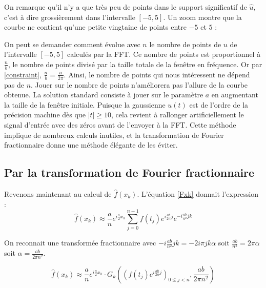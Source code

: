 \documentclass{article}
\begin{document}
On remarque qu'il n'y a que très peu de points dans le support significatif de $\hat{u}$, c'est à dire grossièrement dans l'intervalle $[-5, 5]$. Un zoom montre que la courbe ne contient qu'une petite vingtaine de points entre $-5$ et $5$ :

\begin{center}
\end{center}

On peut se demander comment évolue avec $n$ le nombre de points de $u$ de l'intervalle $[-5, 5]$ calculés par la FFT. 
Ce nombre de points est proportionnel à $\frac{n}{b}$, le nombre de points divisé par la taille totale de la fenêtre en fréquence. Or par \eqref{constraint}, $\frac{n}{b} = \frac{a}{2\pi}$. 
Ainsi, le nombre de points qui nous intéressent ne dépend pas de $n$. Jouer sur le nombre de points n'améliorera pas l'allure de la courbe obtenue.
La solution standard consiste à jouer sur le paramètre $a$ en augmentant la taille de la fenêtre initiale. 
Puisque la gaussienne $u(t)$ est de l'ordre de la précision machine dès que $|t| \ge 10$, cela revient à rallonger artificiellement le signal d'entrée avec des zéros avant de l'envoyer à la FFT. 
Cette méthode implique de nombreux calculs inutiles, et la transformation de Fourier fractionnaire donne une méthode élégante de les éviter.


\subsection{Par la transformation de Fourier fractionnaire}

Revenons maintenant au calcul de $\hat{f}(x_k)$. L'équation \eqref{Fxk} donnait l'expression : 
$$\hat{f}(x_k) \approx \frac{a}{n} e^{i\frac{a}{2}x_k}\sum_{j=0}^{n-1}f(t_j)e^{i\frac{ab}{2n}j}e^{-i\frac{ab}{n^2}jk}$$


On reconnait une transformée fractionnaire avec $-i\frac{ab}{n^2}jk=-2i\pi jk\alpha$ soit $\frac{ab}{n^2}=2\pi \alpha$ soit $\alpha = \frac{ab}{2\pi n^2}$.

\begin{equation}
  \hat{f}(x_k) \approx \frac{a}{n} e^{i\frac{a}{2}x_k}\cdot G_k\left(\left( f(t_j)e^{i \frac{ab}{2n}j}\right)_{0 \le j < n},  \frac{ab}{2\pi n^2}\right) 
  \label{eq:fhatfrac}
\end{equation}
\end{document}
